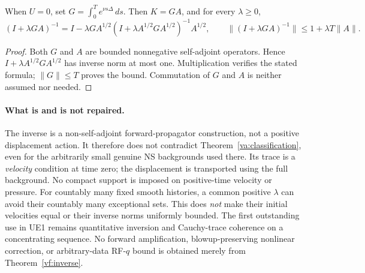 \begin{proposition}\label{vf:heat}
When $U=0$, set $G=\int_0^T e^{\nu s\Delta}\,ds$.
Then $K=GA$, and for every $\lambda\ge0$,
\[
 (I+\lambda GA)^{-1}
 =I-\lambda G A^{1/2}
   (I+\lambda A^{1/2}GA^{1/2})^{-1}A^{1/2},
 \qquad
 \|(I+\lambda GA)^{-1}\|\le1+\lambda T\|A\|.
\]
\end{proposition}
\begin{proof}
Both $G$ and $A$ are bounded nonnegative self-adjoint operators.
Hence $I+\lambda A^{1/2}GA^{1/2}$ has inverse norm at most one.
Multiplication verifies the stated formula; $\|G\|\le T$ proves the bound.
Commutation of $G$ and $A$ is neither assumed nor needed.
\end{proof}

\paragraph{What is and is not repaired.}
The inverse is a non-self-adjoint forward-propagator construction, not a
positive displacement action. It therefore does not contradict
Theorem~\ref{va:classification}, even for the arbitrarily small genuine
NS backgrounds used there. Its trace is a \emph{velocity} condition at
time zero; the displacement is transported using the full background.
No compact support is imposed on positive-time velocity or pressure.
For countably many fixed smooth histories, a common positive $\lambda$
can avoid their countably many exceptional sets. This does \emph{not}
make their initial velocities equal or their inverse norms uniformly bounded.
The first outstanding use in UE1 remains quantitative inversion and
Cauchy-trace coherence on a concentrating sequence. No forward amplification,
blowup-preserving nonlinear correction, or arbitrary-data RF-$q$ bound is
obtained merely from Theorem~\ref{vf:inverse}.
